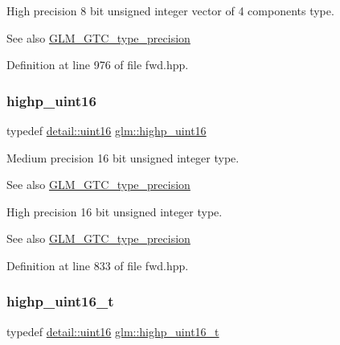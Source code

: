 High precision 8 bit unsigned integer vector of 4 components type. \begin{DoxySeeAlso}{See also}
\hyperlink{group__gtc__type__precision}{G\+L\+M\+\_\+\+G\+T\+C\+\_\+type\+\_\+precision} 
\end{DoxySeeAlso}


Definition at line 976 of file fwd.\+hpp.

\mbox{\label{group__gtc__type__precision_ga4d32967d45ba8365e2a05eaaac85e978}} 
\subsubsection{\texorpdfstring{highp\+\_\+uint16}{highp\_uint16}}
{\footnotesize\ttfamily typedef \hyperlink{namespaceglm_1_1detail_a47b2a7d006d187338e8031a352d1ce56}{detail\+::uint16} \hyperlink{group__gtc__type__precision_ga4d32967d45ba8365e2a05eaaac85e978}{glm\+::highp\+\_\+uint16}}

Medium precision 16 bit unsigned integer type. \begin{DoxySeeAlso}{See also}
\hyperlink{group__gtc__type__precision}{G\+L\+M\+\_\+\+G\+T\+C\+\_\+type\+\_\+precision}
\end{DoxySeeAlso}
High precision 16 bit unsigned integer type. \begin{DoxySeeAlso}{See also}
\hyperlink{group__gtc__type__precision}{G\+L\+M\+\_\+\+G\+T\+C\+\_\+type\+\_\+precision} 
\end{DoxySeeAlso}


Definition at line 833 of file fwd.\+hpp.

\mbox{\label{group__gtc__type__precision_ga3145bc0ee80432c165e985a188a722b3}} 
\subsubsection{\texorpdfstring{highp\+\_\+uint16\+\_\+t}{highp\_uint16\_t}}
{\footnotesize\ttfamily typedef \hyperlink{namespaceglm_1_1detail_a47b2a7d006d187338e8031a352d1ce56}{detail\+::uint16} \hyperlink{group__gtc__type__precision_ga3145bc0ee80432c165e985a188a722b3}{glm\+::highp\+\_\+uint16\+\_\+t}}

